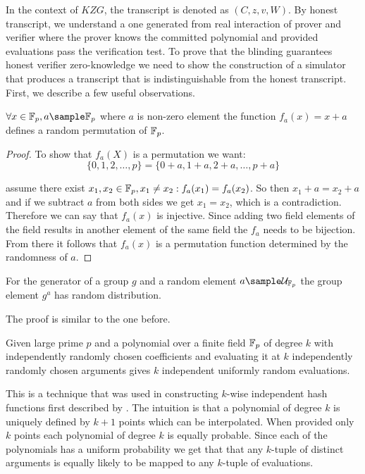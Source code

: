 In the context of $KZG$, the transcript is denoted as $(C, z, v, W)$. By honest transcript, we understand a one generated from real interaction of prover and verifier where the prover knows the committed polynomial and provided evaluations pass the verification test. To prove that the blinding guarantees honest verifier zero-knowledge we need to show the construction of a simulator that produces a transcript that is indistinguishable from the honest transcript. First, we describe a few useful observations.

\begin{lemma}
\label{lemma:addition-randomness}
    $\forall x \in \field, a \sample \field$ where $a$ is non-zero element the function $f_a(x) = x + a$ defines a random permutation of $\mathbb{F}_p$.
\end{lemma}

\begin{proof}
    To show that $f_a(X)$ is a permutation we want:
    $$\{0, 1, 2, \ldots, p\} = \{0+a, 1+a, 2+a, \ldots, p+a\}$$
    
    assume there exist $x_1, x_2 \in \mathbb{F}_p, x_1 \neq x_2: f_a(x_1) = f_a(x_2)$. So then $x_1 + a = x_2 + a$ and if we subtract $a$ from both sides we get $x_1 = x_2$, which is a contradiction. Therefore we can say that $f_a(x)$ is injective. Since adding two field elements of the field results in another element of the same field the $f_a$ needs to be bijection. From there it follows that $f_a(x)$ is a permutation function determined by the randomness of $a$.
\end{proof}

\begin{lemma}
\label{lemma:multiplication-randomness}
    For the generator of a group $g$ and a random element $a \sample \mathcal{U}_{\field}$ the group element $g^a$ has random distribution.
\end{lemma}

The proof is similar to the one before. 

\begin{lemma}
\label{lemma:kwise-eval}
    Given large prime $p$ and a polynomial over a finite field $\mathbb{F}_p$ of degree $k$ with independently randomly chosen coefficients and evaluating it at $k$ independently randomly chosen arguments gives $k$ independent uniformly random evaluations.
\end{lemma}

This is a technique that was used in constructing $k$-wise independent hash functions first described by \cite{WEGMAN-kwise-hash}. The intuition is that a polynomial of degree $k$ is uniquely defined by $k+1$ points which can be interpolated. When provided only $k$ points each polynomial of degree $k$ is equally probable. Since each of the polynomials has a uniform probability we get that that any $k$-tuple of distinct arguments is equally likely to be mapped to any $k$-tuple of evaluations.

